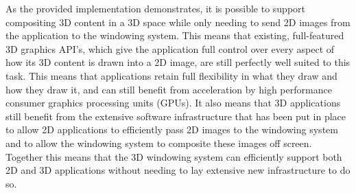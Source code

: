 	As the provided implementation demonstrates, it is possible to support compositing 3D content in a 3D space while only needing to send 2D images from the application to the windowing system. This means that existing, full-featured 3D graphics API’s, which give the application full control over every aspect of how its 3D content is drawn into a 2D image, are still perfectly well suited to this task. This means that applications retain full flexibility in what they draw and how they draw it, and can still benefit from acceleration by high performance consumer graphics processing units (GPUs). It also means that 3D applications still benefit from the extensive software infrastructure that has been put in place to allow 2D applications to efficiently pass 2D images to the windowing system and to allow the windowing system to composite these images off screen. Together this means that the 3D windowing system can efficiently support both 2D and 3D applications without needing to lay extensive new infrastructure to do so.
